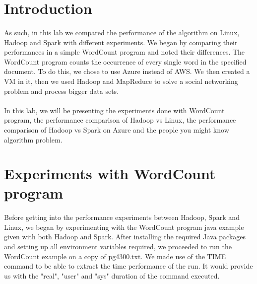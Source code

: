 \documentclass[12pt]{article}
\begin{document}
\section{Introduction}
	\paragraph{} As such, in this lab we compared the performance of the algorithm on Linux, Hadoop and Spark with 
	different experiments. We began by comparing  their performances in a simple WordCount program and noted their 
	differences. The WordCount program counts the occurrence of every single word in the specified document. 
	To do this, we chose to use Azure instead of AWS. We then created a VM in it, then we used Hadoop and MapReduce 
	to solve a social networking problem and process bigger data sets.
	\bigskip

	\paragraph{} In this lab, we will be presenting the experiments done with WordCount program, the performance 
	comparison of Hadoop vs Linux, the performance comparison of Hadoop vs Spark on Azure and the people you might
	know algorithm problem. 

	\bigskip

	\pagebreak

\section{Experiments with WordCount program}
	\paragraph{} Before getting into the performance experiments between Hadoop, Spark and Linux, 
	we began by experimenting with the WordCount program java example given with both Hadoop and Spark. 
	After installing the required Java packages and setting up all environment variables required, we 
	proceeded to run the WordCount example on a copy of pg4300.txt. We made use of the TIME command to
	be able to extract the time performance of the run. It would provide us with the "real", "user" and
	"sys" duration of the command executed.
\end{document}
